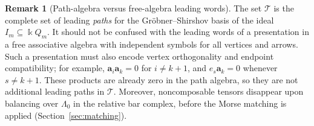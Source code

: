 \documentclass[a4paper,11pt,oneside,reqno]{amsart}
\theoremstyle{definition}
\newtheorem{remark}[theorem]{Remark}
\numberwithin{equation}{section}
\begin{document}
	
    \begin{remark}[Path-algebra versus free-algebra leading words]
        The set $\mathcal T$ is the complete set of leading
        \emph{paths} for the Gr\"obner--Shirshov basis of the ideal
        $I_m\subseteq\Bbbk Q_m$.  It should not be confused with the
        leading words of a presentation in a free associative algebra
        with independent symbols for all vertices and arrows.
        Such a presentation must also encode vertex orthogonality and
        endpoint compatibility; for example, $\mathbf a_i\mathbf a_k=0$
        for $i\ne k+1$, and $e_s\mathbf a_k=0$ whenever $s\ne k+1$.
        These products are already zero in the path algebra, so they are
        not additional leading paths in $\mathcal T$.  Moreover,
        noncomposable tensors disappear upon balancing over $\Lambda_0$
        in the relative bar complex, before the Morse matching is
        applied (Section~\ref{sec:matching}).
    \end{remark}
	
\end{document}
